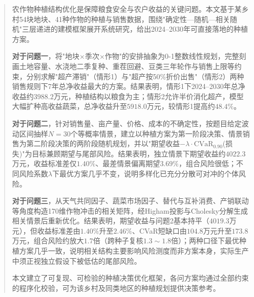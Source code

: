 \maketitle%
\begin{abstract}%

	农作物种植结构优化是保障粮食安全与农户收益的关键问题。本文基于某乡村54块地块、41种作物的种植与销售数据，围绕"确定性—随机—相关随机"三层递进的建模框架展开系统研究，给出2024--2030年可直接落地的种植方案。

	\textbf{对于问题一}，将"地块$\times$季次$\times$作物"的安排抽象为0-1整数线性规划，完整刻画土地容量、水浇地二季复种、重茬回避、豆类三年轮作与销售上限等约束，分别求解"超产滞销"（情形1）与"超产按50\%折价出售"（情形2）两种销售规则下7年总净收益最大的方案。结果表明，情形1下2024--2030年总净收益约$\mathbf{3988.2}$万元，种植结构以粮食为主；情形2允许半价消化超产，模型大幅扩种高收益蔬菜，总净收益升至$\mathbf{5918.0}$万元，较情形1提高约$48.4\%$。

	\textbf{对于问题二}，针对销售量、亩产量、价格、成本的不确定性，按题目给定波动区间抽样$N=30$个等概率情景，建立以种植方案为第一阶段决策、情景销售为第二阶段决策的两阶段随机规划，并以"期望收益$-\lambda\cdot\mathrm{CVaR}_{0.90}$(损失)"为目标兼顾期望与尾部风险。结果表明，独立情景下期望收益约$\mathbf{4022.3}$万元，收益标准差仅$1.40\%$、最差情景偏离期望$3.69\%$，组合风险很低；不同风险系数$\lambda$下最优方案几乎不变，说明多样化已充分分散可对冲的个体风险。

	\textbf{对于问题三}，从天气共同因子、蔬菜市场因子、替代与互补消费、产销联动等角度构造170维作物冲击的相关矩阵，经Higham投影与Cholesky分解生成相关情景后重新优化。结果表明，期望收益与问题2基本持平（$\mathbf{4019.3}$万元），但收益标准差由$1.40\%$升至$2.46\%$、CVaR短缺口由$104.8$万元升至$173.8$万元，组合风险约放大$1.7$倍（跨种子复核$1.3\sim1.8$倍）；两种口径下最优种植方案几乎一致，说明相关结构主要影响风险测度而非方案本身，实际生产中须正视独立假设下被低估的尾部风险。

	本文建立了可复现、可检验的种植决策优化框架，各问方案均通过全部约束的程序化校验，可为该乡村及同类地区的种植规划提供决策参考。

\end{abstract}
